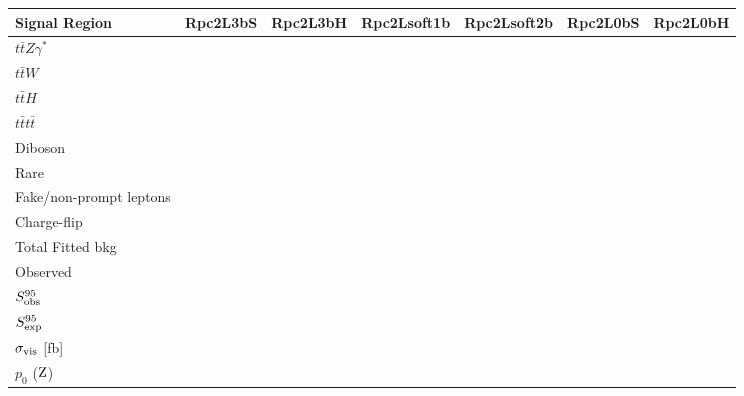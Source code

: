 \begin{table}
\scriptsize
\begin{center}
\vspace*{-0.035\textwidth}
\begin{tabular}{|l|r|r|r|r|r|r|}
\hline
Signal Region & {\bf Rpc2L3bS } & {\bf Rpc2L3bH } & {\bf Rpc2Lsoft1b  } & {\bf Rpc2Lsoft2b } & {\bf Rpc2L0bS } & {\bf Rpc2L0bH }\\
\hline
\hline
$t\bar{t}Z\gamma^*$      &        &        &        &        &    &    \\
$t\bar{t}W$              &        &        &        &        &    &    \\
$t\bar{t}H$              &        &        &        &        &    &    \\
$t\bar{t}t\bar{t}$       &        &        &        &        &    &    \\
Diboson                  &        &        &        &        &    &    \\
Rare                     &        &        &        &        &    &    \\
Fake/non-prompt leptons  &        &        &        &        &    &    \\
Charge-flip              &        &        &        &        &    &    \\	
\hline
Total Fitted bkg         &        &        &        &        &    &    \\
\hline
Observed                 &        &        &        &        &    &    \\
\hline
$S_{\rm obs}^{95}$       &	  &	   &	    &	     &    &    \\
$S_{\rm exp}^{95}$       &	  &	   &	    &	     &    &    \\
$\sigma_{\rm{vis}}$ [fb] &        &        &        &        &    &    \\
$p_{0}$ ($\rm Z$)        &        &        &        &        &    &    \\
\hline 
\end{tabular}

\vspace*{1cm}


\end{center}
\end{table}
